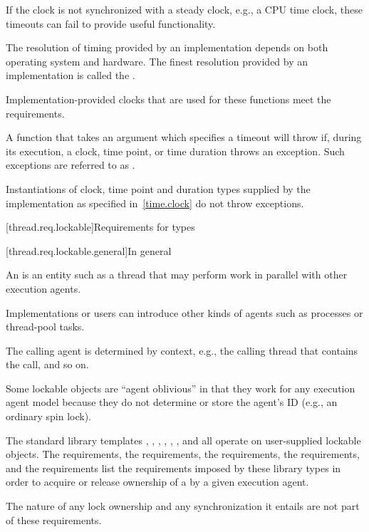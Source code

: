 \pnum
\begin{note}
If the clock is not synchronized with a steady clock, e.g., a CPU time clock, these
timeouts can fail to provide useful functionality.
\end{note}

\pnum
The resolution of timing provided by an implementation depends on both operating system
and hardware. The finest resolution provided by an implementation is called the
.

\pnum
Implementation-provided clocks that are used for these functions meet the
 requirements.

\pnum
A function that takes an argument which specifies a timeout will throw if,
during its execution, a clock, time point, or time duration throws an exception.
Such exceptions are referred to as .
\begin{note}
Instantiations of clock, time point and duration types supplied by
the implementation as specified in~\ref{time.clock} do not throw exceptions.
\end{note}

[thread.req.lockable]{Requirements for  types}

[thread.req.lockable.general]{In general}

\pnum
An  is an entity such as a thread that may perform work in parallel with
other execution agents.
\begin{note}
Implementations or users can introduce other kinds of
agents such as processes or thread-pool tasks.
\end{note}
The calling agent is determined by
context, e.g., the calling thread that contains the call, and so on.

\pnum
\begin{note}
Some lockable objects are ``agent oblivious'' in that they work for any
execution agent model because they do not determine or store the agent's ID (e.g., an
ordinary spin lock).
\end{note}

\pnum
The standard library templates ,
,
,
, ,
, and
 all operate on user-supplied
lockable objects. The  requirements, the  requirements,
the  requirements,
the  requirements, and
the  requirements
list the requirements imposed by these library types
in order to acquire or release ownership of a  by a given execution agent.
\begin{note}
The nature of any lock ownership and any synchronization it entails are not part
of these requirements.
\end{note}

